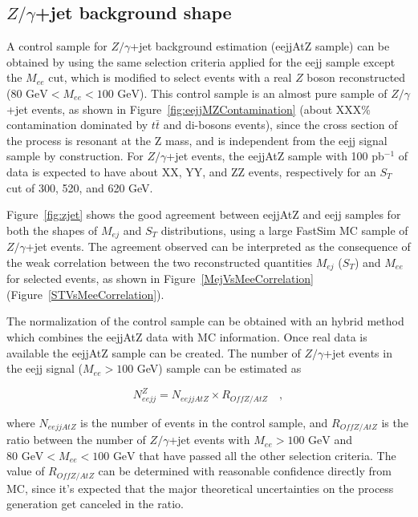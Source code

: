 \subsection{$Z/\gamma$+jet background shape} 

A control sample for $Z/\gamma$+jet background estimation (eejjAtZ sample) 
can be obtained by using the same selection criteria applied for the eejj sample except 
the $M_{ee}$ cut, which is modified to select events with a real $Z$ boson reconstructed 
($80\mbox{ GeV} < M_{ee} < 100\mbox{ GeV}$). This control sample is an almost pure sample of  
$Z/\gamma$+jet events, as shown in Figure~\ref{fig:eejjMZContamination} 
(about XXX\% contamination dominated by $t\bar{t}$ and di-bosons events), 
since the cross section of the process is resonant at the Z mass, and is 
independent from the eejj signal sample by construction. 
For $Z/\gamma$+jet events, the eejjAtZ sample with 100 pb$^{-1}$ of data 
is expected to have about XX, YY, and ZZ events, respectively for an $S_{T}$ cut of 300, 520, and 620 GeV.

Figure~\ref{fig:zjet} shows the good agreement between eejjAtZ and eejj samples for both the shapes of $M_{ej}$ 
and $S_{T}$ distributions, using a large FastSim MC sample of $Z/\gamma$+jet events. 
The agreement observed can be interpreted as the consequence of the 
weak correlation between the two reconstructed quantities $M_{ej}$ ($S_{T}$) and $M_{ee}$ for selected events, as shown in 
Figure~\ref{MejVsMeeCorrelation} (Figure~\ref{STVsMeeCorrelation}).

The normalization of the control sample can be obtained with an hybrid method which combines the eejjAtZ data with 
MC information. Once real data is available the eejjAtZ sample can be created. 
The number of $Z/\gamma$+jet events in the eejj signal ($M_{ee}>100$ GeV) sample can be estimated as

\begin{equation} \label{formula:NeejFromNemujj}
N_{eejj}^{Z} = N_{eejjAtZ} \times R_{OffZ/AtZ} \quad , 
\end{equation}

where $N_{eejjAtZ}$ is the number of events in the control sample, and 
$R_{OffZ/AtZ}$ is the ratio between the number of $Z/\gamma$+jet events 
with $M_{ee} > 100\mbox{ GeV}$ and $80\mbox{ GeV} < M_{ee} < 100\mbox{ GeV}$ 
that have passed all the other selection criteria.
The value of $R_{OffZ/AtZ}$ can be determined with reasonable confidence directly from MC, 
since it's expected that the major theoretical uncertainties on the process generation 
get canceled in the ratio. 


